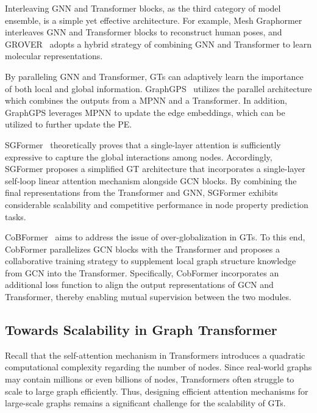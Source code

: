 Interleaving GNN and Transformer blocks, as the third category of model ensemble, is a simple yet effective architecture.
For example, Mesh Graphormer~\cite{lin2021mesh} interleaves GNN and Transformer blocks to reconstruct human poses, and GROVER~\cite{rong2020self} adopts a hybrid strategy of combining GNN and Transformer to learn molecular representations.

By paralleling GNN and Transformer, GTs can adaptively learn the importance of both local and global information.
GraphGPS~\cite{rampavsek2022recipe} utilizes the parallel architecture which combines the outputs from a MPNN and a Transformer. In addition, GraphGPS leverages MPNN to update the edge embeddings, which can be utilized to further update the PE.

SGFormer~\cite{wu2024simplifying} theoretically proves that a single-layer attention is sufficiently expressive to capture the global interactions among nodes. Accordingly, SGFormer proposes a simplified GT architecture that incorporates a single-layer self-loop linear attention mechanism alongside GCN blocks. By combining the final representations from the Transformer and GNN, SGFormer exhibits considerable scalability and competitive performance in node property prediction tasks.

CoBFormer~\cite{xing2024less} aims to address the issue of over-globalization in GTs. To this end, CobFormer parallelizes GCN blocks with the Transformer and proposes a collaborative training strategy to supplement local graph structure knowledge from GCN into the Transformer. Specifically, CobFormer incorporates an additional loss function to align the output representations of GCN and Transformer, thereby enabling mutual supervision between the two modules.


\subsection{Towards Scalability in Graph Transformer}
\label{architecture:Scalability}
Recall that the self-attention mechanism in Transformers introduces a quadratic computational complexity regarding the number of nodes. Since real-world graphs may contain millions or even billions of nodes,  Transformers often struggle to scale to large graph efficiently.
Thus, designing efficient attention mechanisms for large-scale graphs remains a significant challenge for the scalability of GTs. 

